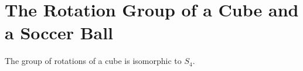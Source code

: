 \section{The Rotation Group of a Cube and a Soccer Ball}

\begin{theorem}
	The group of rotations of a cube is isomorphic to $S_4$.
\end{theorem}
